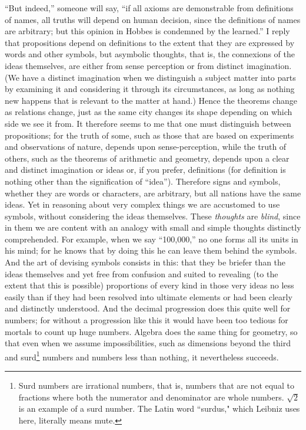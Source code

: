 \documentclass[twoside,openright]{article}
\begin{document}
``But indeed,'' someone will say, ``if all axioms are demonstrable from
definitions of names, all truths will depend on human decision, since the
definitions of names are arbitrary; but this opinion in Hobbes is condemned by
the learned.''  I reply that propositions depend on definitions to the extent
that they are expressed by words and other symbols, but asymbolic thoughts,
that is, the connexions of the ideas themselves, are either from sense
perception or from distinct imagination.  (We have a distinct imagination when
we distinguish a subject matter into parts by examining it and considering it
through its circumstances, as long as nothing new happens that is relevant to
the matter at hand.)  Hence the theorems change as relations change, just as
the same city changes its shape depending on which side we see it from.  It
therefore seems to me that one must distinguish between propositions; for the
truth of some, such as those that are based on experiments and observations of
nature, depends upon sense-perception, while the truth of others, such as the
theorems of arithmetic and geometry, depends upon a clear and distinct
imagination or ideas or, if you prefer, definitions (for definition is nothing
other than the signification of ``idea'').  Therefore signs and symbols,
whether they are words or characters, are arbitrary, but all nations have the
same ideas.  Yet in reasoning about very complex things we are accustomed to
use symbols, without considering the ideas themselves.  These {\em thoughts}
are {\em blind}, since in them we are content with an analogy with small and
simple thoughts distinctly comprehended.  For example, when we say
``100,000,'' no one forms all its units in his mind; for he knows that by
doing this he can leave them behind the symbols.  And the art of devising
symbols consists in this: that they be briefer than the ideas themselves and
yet free from confusion and suited to revealing (to the extent that this is
possible) proportions of every kind in those very ideas no less easily than if
they had been resolved into ultimate elements or had been clearly and
distinctly understood.  And the decimal progression does this quite well for
numbers; for without a progression like this it would have been too tedious
for mortals to count up huge numbers.  Algebra does the same thing for
geometry, so that even when we assume impossibilities, such as dimensions
beyond the third and surd\footnote{Surd numbers are irrational numbers, that is, numbers that are not equal to fractions where both the numerator and denominator are whole numbers.  $\sqrt{2}$ is an example of a surd number.  The Latin word ``surdus," which Leibniz uses here, literally means mute.} numbers and numbers less than nothing, it
nevertheless succeeds.
\end{document}
